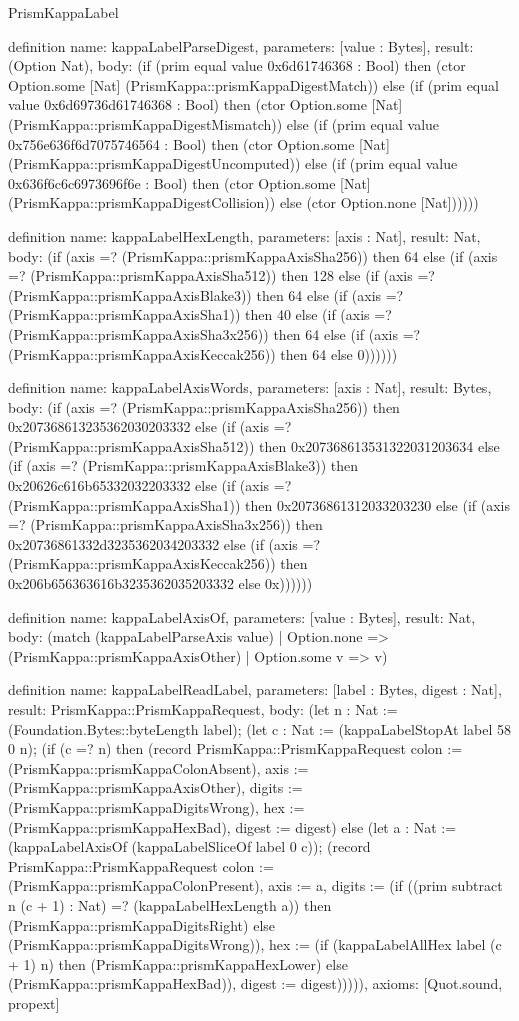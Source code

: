 \begin{lexlean}{PrismKappaLabel}
\begin{semanticmodule}
definition{
  name: kappaLabelParseDigest,
  parameters: [value : Bytes],
  result: (Option Nat),
  body: (if (prim equal value 0x6d61746368 : Bool) then (ctor Option.some [Nat] (PrismKappa::prismKappaDigestMatch)) else (if (prim equal value 0x6d69736d61746368 : Bool) then (ctor Option.some [Nat] (PrismKappa::prismKappaDigestMismatch)) else (if (prim equal value 0x756e636f6d7075746564 : Bool) then (ctor Option.some [Nat] (PrismKappa::prismKappaDigestUncomputed)) else (if (prim equal value 0x636f6c6c6973696f6e : Bool) then (ctor Option.some [Nat] (PrismKappa::prismKappaDigestCollision)) else (ctor Option.none [Nat])))))
}

definition{
  name: kappaLabelHexLength,
  parameters: [axis : Nat],
  result: Nat,
  body: (if (axis =? (PrismKappa::prismKappaAxisSha256)) then 64 else (if (axis =? (PrismKappa::prismKappaAxisSha512)) then 128 else (if (axis =? (PrismKappa::prismKappaAxisBlake3)) then 64 else (if (axis =? (PrismKappa::prismKappaAxisSha1)) then 40 else (if (axis =? (PrismKappa::prismKappaAxisSha3x256)) then 64 else (if (axis =? (PrismKappa::prismKappaAxisKeccak256)) then 64 else 0))))))
}

definition{
  name: kappaLabelAxisWords,
  parameters: [axis : Nat],
  result: Bytes,
  body: (if (axis =? (PrismKappa::prismKappaAxisSha256)) then 0x207368613235362030203332 else (if (axis =? (PrismKappa::prismKappaAxisSha512)) then 0x207368613531322031203634 else (if (axis =? (PrismKappa::prismKappaAxisBlake3)) then 0x20626c616b65332032203332 else (if (axis =? (PrismKappa::prismKappaAxisSha1)) then 0x20736861312033203230 else (if (axis =? (PrismKappa::prismKappaAxisSha3x256)) then 0x20736861332d3235362034203332 else (if (axis =? (PrismKappa::prismKappaAxisKeccak256)) then 0x206b656363616b3235362035203332 else 0x))))))
}

definition{
  name: kappaLabelAxisOf,
  parameters: [value : Bytes],
  result: Nat,
  body: (match (kappaLabelParseAxis value)
    | Option.none => (PrismKappa::prismKappaAxisOther)
    | Option.some v => v)
}

definition{
  name: kappaLabelReadLabel,
  parameters: [label : Bytes, digest : Nat],
  result: PrismKappa::PrismKappaRequest,
  body: (let n : Nat := (Foundation.Bytes::byteLength label); (let c : Nat := (kappaLabelStopAt label 58 0 n); (if (c =? n) then (record PrismKappa::PrismKappaRequest {colon := (PrismKappa::prismKappaColonAbsent), axis := (PrismKappa::prismKappaAxisOther), digits := (PrismKappa::prismKappaDigitsWrong), hex := (PrismKappa::prismKappaHexBad), digest := digest}) else (let a : Nat := (kappaLabelAxisOf (kappaLabelSliceOf label 0 c)); (record PrismKappa::PrismKappaRequest {colon := (PrismKappa::prismKappaColonPresent), axis := a, digits := (if ((prim subtract n (c + 1) : Nat) =? (kappaLabelHexLength a)) then (PrismKappa::prismKappaDigitsRight) else (PrismKappa::prismKappaDigitsWrong)), hex := (if (kappaLabelAllHex label (c + 1) n) then (PrismKappa::prismKappaHexLower) else (PrismKappa::prismKappaHexBad)), digest := digest}))))),
  axioms: [Quot.sound, propext]
}


\end{semanticmodule}
\end{lexlean}
